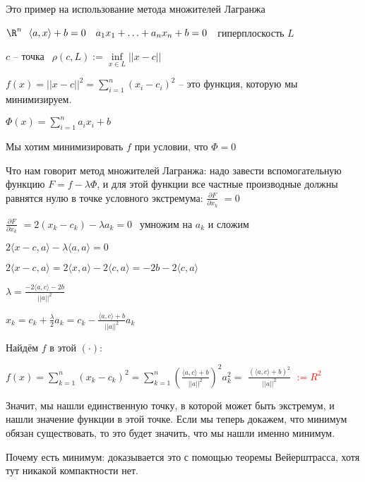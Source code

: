 \newpage
{}

Это пример на использование метода множителей Лагранжа

\begin{example} \thmslashn
    
    $\R^n ~~ \langle a, x \rangle + b = 0 ~~~ a_1x_1 + \dotsc + a_nx_n + b = 0 ~~ $ гиперплоскость $L$
    
    $c$ -- точка $~~ \rho(c, L) := \inf\limits_{x \in L} ||x - c||$
    
    $f(x) = ||x - c||^2 = \sum\limits_{i = 1}^n (x_i - c_i)^2$ -- это функция, которую мы минимизируем.
    
    $\Phi(x) = \sum\limits_{i = 1}^n a_ix_i + b$
    
    Мы хотим минимизировать $f$ при условии, что $\Phi = 0$
    
    Что нам говорит метод множителей Лагранжа: надо завести вспомогательную функцию  $F = f - \lambda\Phi$, и для этой функции все частные производные должны равнятся нулю в точке условного экстремума: \large $\frac{\partial F}{\partial x_k}$ \normalsize $ = 0$
    
    \large $\frac{\partial F}{\partial x_k}$ \normalsize $= 2(x_k - c_k) - \lambda a_k = 0 ~~$ умножим на $a_k$ и сложим
    
    $2\langle x - c, a \rangle - \lambda \langle a, a \rangle = 0$
    
    $2\langle x - c, a \rangle = 2\langle x, a \rangle - 2\langle c, a \rangle = -2b - 2\langle c, a \rangle$
    
    $\lambda = $\large $\frac{-2\langle a, c \rangle - 2b}{||a||^2}$ \normalsize
    
    $x_k = c_k + \frac{\lambda}{2}a_k = c_k - $\large $\frac{\langle a, c \rangle + b}{||a||^2}$\normalsize$a_k$
    
    Найдём $f$ в этой $(\cdot)$: 
    
    $f(x) = \sum\limits_{k = 1}^n (x_k - c_k)^2 = \sum\limits_{k = 1}^n \left(\frac{\langle a, c \rangle + b}{||a||^2}\right)^2a_k^2 = $ \large $\frac{(\langle a, c \rangle + b)^2}{||a||^2}$ \normalsize \textcolor{red}{$ := R^2$}
    
    Значит, мы нашли единственную точку, в которой может быть экстремум, и нашли значение функции в этой точке. Если мы теперь докажем, что минимум обязан существовать, то это будет значить, что мы нашли именно минимум.
    
    Почему есть минимум: доказывается это с помощью теоремы Вейерштрасса, хотя тут никакой компактности нет.
    

\end{example}
